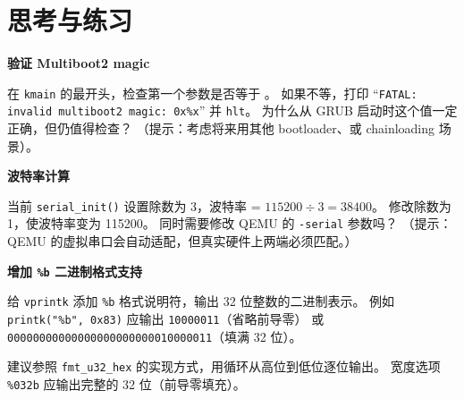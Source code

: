 \section{思考与练习}

\begin{exercise}
\textbf{验证 Multiboot2 magic}

在 \texttt{kmain} 的最开头，检查第一个参数是否等于 。
如果不等，打印 ``\texttt{FATAL: invalid multiboot2 magic: 0x\%x}'' 并 \texttt{hlt}。
为什么从 GRUB 启动时这个值一定正确，但仍值得检查？
（提示：考虑将来用其他 bootloader、或 chainloading 场景）。
\end{exercise}

\begin{exercise}
\textbf{波特率计算}

当前 \texttt{serial\_init()} 设置除数为 3，波特率 = $115200 \div 3 = 38400$。
修改除数为 1，使波特率变为 115200。
同时需要修改 QEMU 的 \texttt{-serial} 参数吗？
（提示：QEMU 的虚拟串口会自动适配，但真实硬件上两端必须匹配。）
\end{exercise}

\begin{exercise}
\textbf{增加 \texttt{\%b} 二进制格式支持}

给 \texttt{vprintk} 添加 \texttt{\%b} 格式说明符，输出 32 位整数的二进制表示。
例如 \texttt{printk("\%b", 0x83)} 应输出 \texttt{10000011}（省略前导零）
或 \texttt{00000000000000000000000010000011}（填满 32 位）。

建议参照 \texttt{fmt\_u32\_hex} 的实现方式，用循环从高位到低位逐位输出。
宽度选项 \texttt{\%032b} 应输出完整的 32 位（前导零填充）。
\end{exercise}

